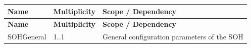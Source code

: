 \begin{longtable}{|l|l|l|}
\hline
\begin{minipage}{0.25\linewidth}\raggedright\vspace{.75ex}\textbf{Name}\vspace{.75ex}\end{minipage} & \begin{minipage}{0.17\linewidth}\raggedright\vspace{.75ex}\textbf{Multiplicity}\vspace{.75ex}\end{minipage} & \begin{minipage}{0.50\linewidth}\raggedright\vspace{.75ex}\textbf{Scope / Dependency}\vspace{.75ex}\end{minipage}\\
\hline\hline
\endfirsthead
\hline
\begin{minipage}{0.25\linewidth}\raggedright\vspace{.75ex}\textbf{Name}\vspace{.75ex}\end{minipage} & \begin{minipage}{0.17\linewidth}\raggedright\vspace{.75ex}\textbf{Multiplicity}\vspace{.75ex}\end{minipage} & \begin{minipage}{0.50\linewidth}\raggedright\vspace{.75ex}\textbf{Scope / Dependency}\vspace{.75ex}\end{minipage}\\
\hline\hline
\endhead
\hline
\endfoot
\hline
\endlastfoot
\begin{minipage}{0.25\linewidth}\raggedright\vspace{.75ex}SOHGeneral\vspace{.75ex}\end{minipage} & \begin{minipage}{0.17\linewidth}\raggedright\vspace{.75ex}1..1\vspace{.75ex}\end{minipage} & \begin{minipage}{0.50\linewidth}\raggedright\vspace{.75ex}General configuration parameters of the SOH\vspace{.75ex}\end{minipage}\\\hline

\end{longtable}
